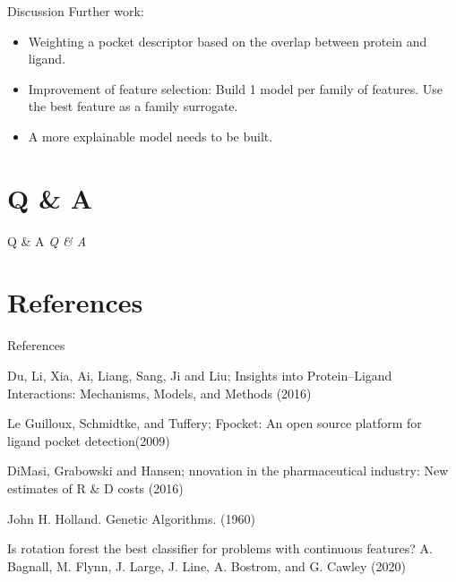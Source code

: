 \documentclass{beamer}
\begin{document}
\begin{frame}[t]{Discussion}
Further work:
\begin{itemize}
\item Weighting a pocket descriptor based on the overlap between protein and ligand.
\item Improvement of feature selection: Build 1 model per family of features. Use the best feature as a family surrogate.
\item A more explainable model needs to be built.
\end{itemize} 

\end{frame}

\section{Q \& A}

\begin{frame}[t]{Q \& A}
  \centering \Huge
  \emph{Q \& A}
\end{frame}

\section{References}

\begin{frame}[t]{References}

\begin{thebibliography}{1}

\alert{Du,  Li,  Xia,  Ai,  Liang,  Sang,  Ji and Liu; Insights into Protein–Ligand Interactions: Mechanisms, Models, and Methods (2016)}

\alert{Le Guilloux,  Schmidtke, and Tuffery; Fpocket: An open source platform for ligand pocket detection(2009)}

\alert{DiMasi,  Grabowski and Hansen; nnovation in the pharmaceutical industry: New estimates of R \& D costs (2016)}

\alert{John H. Holland.  Genetic Algorithms. (1960)}

\alert{Is rotation forest the best classifier for problems with continuous features? A. Bagnall, M. Flynn, J. Large, J. Line, A. Bostrom, and G. Cawley (2020)}

\end{thebibliography}

\end{frame}
\end{document}
